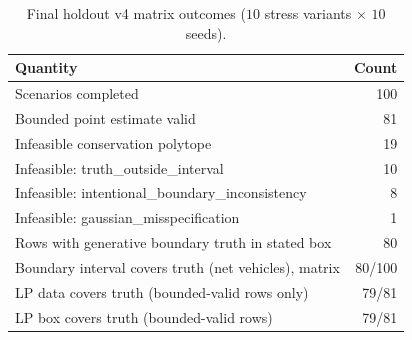 \begin{table}[t]
\centering
\caption{Final holdout v4 matrix outcomes ($10$ stress variants $\times$ $10$ seeds).}
\label{tab:matrix-outcomes}
\begin{tabular}{lr}
\toprule
Quantity & Count \\
\midrule
Scenarios completed & 100 \\
Bounded point estimate valid & 81 \\
Infeasible conservation polytope & 19 \\
Infeasible: truth\_outside\_interval & 10 \\
Infeasible: intentional\_boundary\_inconsistency & 8 \\
Infeasible: gaussian\_misspecification & 1 \\
Rows with generative boundary truth in stated box & 80 \\
\midrule
Boundary interval covers truth (net vehicles), matrix & 80/100 \\
LP data covers truth (bounded-valid rows only) & 79/81 \\
LP box covers truth (bounded-valid rows) & 79/81 \\
\bottomrule
\end{tabular}
\end{table}
